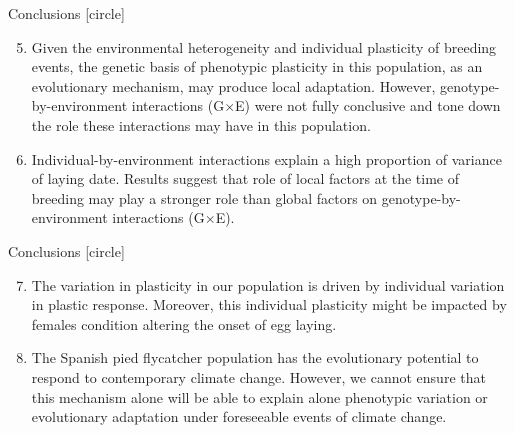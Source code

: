 \documentclass[compress]{beamer}
\begin{document}
\begin{frame}{Conclusions}
 [circle]
 \begin{enumerate}\setcounter{enumi}{4}
 \justifying
\item <1->Given the environmental heterogeneity and individual plasticity of breeding events, the genetic basis of phenotypic plasticity in this population, as an evolutionary mechanism, may produce local adaptation. However, genotype-by-environment interactions (G$\times$E) were not fully conclusive and tone down the role these interactions may have in this population.
\vspace{0.3cm}

\item <2-> Individual-by-environment interactions explain a high proportion of variance of laying date. Results suggest that role of local factors at the time of breeding may play a stronger role than global factors on genotype-by-environment interactions (G$\times$E).

\end{enumerate}
\end{frame}

\begin{frame}{Conclusions}
 [circle]
 \begin{enumerate}\setcounter{enumi}{6}
 \justifying
\item <1->The variation in plasticity in our population is driven by individual variation in plastic response. Moreover, this individual plasticity might be impacted by females condition altering the onset of egg laying.

\vspace{0.3cm}

\item <2-> The Spanish pied flycatcher population has the evolutionary potential to respond to contemporary climate change. However, we cannot ensure that this mechanism alone will be able to explain alone phenotypic variation or evolutionary adaptation under foreseeable events of climate change.

\end{enumerate}
\end{frame}
\end{document}
